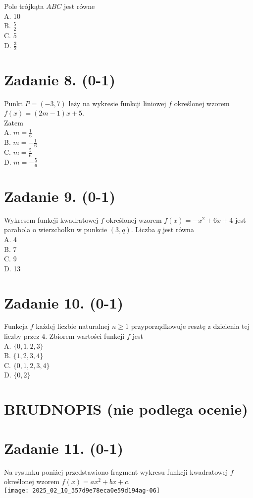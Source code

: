 \documentclass[10pt]{article}
\begin{document}
Pole trójkąta \(A B C\) jest równe\\
A. 10\\
B. \(\frac{5}{2}\)\\
C. 5\\
D. \(\frac{3}{2}\)

\section*{Zadanie 8. (0-1)}
Punkt \(P=(-3,7)\) leży na wykresie funkcji liniowej \(f\) określonej wzorem \(f(x)=(2 m-1) x+5\).\\
Zatem\\
A. \(m=\frac{1}{6}\)\\
B. \(m=-\frac{1}{6}\)\\
C. \(m=\frac{5}{6}\)\\
D. \(m=-\frac{5}{6}\)

\section*{Zadanie 9. (0-1)}
Wykresem funkcji kwadratowej \(f\) określonej wzorem \(f(x)=-x^{2}+6 x+4\) jest parabola o wierzchołku w punkcie \((3, q)\). Liczba \(q\) jest równa\\
A. 4\\
B. 7\\
C. 9\\
D. 13

\section*{Zadanie 10. (0-1)}
Funkcja \(f\) każdej liczbie naturalnej \(n \geq 1\) przyporządkowuje resztę z dzielenia tej liczby przez 4. Zbiorem wartości funkcji \(f\) jest\\
A. \(\{0,1,2,3\}\)\\
B. \(\{1,2,3,4\}\)\\
C. \(\{0,1,2,3,4\}\)\\
D. \(\{0,2\}\)

\section*{BRUDNOPIS (nie podlega ocenie)}
\section*{Zadanie 11. (0-1)}
Na rysunku poniżej przedstawiono fragment wykresu funkcji kwadratowej \(f\) określonej wzorem \(f(x)=a x^{2}+b x+c\).\\
\texttt{[image: 2025\_02\_10\_357d9e78eca0e59d194ag-06]}
\end{document}
